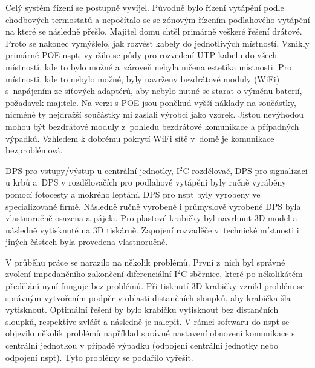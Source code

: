 Celý systém řízení se postupně vyvíjel. Původně bylo řízení vytápění podle chodbových termostatů a nepočítalo se se zónovým řízením podlahového vytápění na které se následně přešlo. Majitel domu chtěl primárně veškeré řešení drátové. Proto se nakonec vymýšlelo, jak rozvést kabely do jednotlivých místností. Vznikly primárně POE \acrshort{nspt}, využilo se půdy pro rozvedení UTP kabelu do všech místností, kde to bylo možné a~zároveň nebyla ničena estetika místnosti. Pro místnosti, kde to nebylo možné, byly navrženy bezdrátové moduly (WiFi) s~napájením ze síťových adaptérů, aby nebylo nutné se starat o výměnu baterií, požadavek majitele. Na verzi s POE jsou poněkud vyšší náklady na součástky, nicméně ty nejdražší součástky mi zaslali výrobci jako vzorek. Jistou nevýhodou mohou být bezdrátové moduly z~pohledu bezdrátové komunikace a případných výpadků. Vzhledem k dobrému pokrytí WiFi sítě v~domě je komunikace bezproblémová.

DPS pro vstupy/výstup u centrální jednotky, I$^{2}$C rozdělovač, DPS pro signalizaci u krbů a~DPS v rozdělovačích pro podlahové vytápění byly ručně vyráběny pomocí fotocesty a mokrého leptání. DPS pro \acrshort{nspt} byly vyrobeny ve specializované firmě. Následně ručně vyrobené i průmyslově vyrobené DPS byla vlastnoručně osazena a pájela. Pro plastové krabičky byl navrhnut 3D model a následně vytisknuté na 3D tiskárně. Zapojení rozvaděče v~technické místnosti i jiných částech byla provedena vlastnoručně.

V průběhu práce se narazilo na několik problémů. První z~nich byl správné zvolení impedančního zakončení diferenciální I$^{2}$C sběrnice, které po několikátém předělání nyní funguje bez problémů. Při tisknutí 3D krabičky vznikl problém se správným vytvořením podpěr v oblasti distančních sloupků, aby krabička šla vytisknout. Optimální řešení by bylo krabičku vytisknout bez distančních sloupků, respektive zvlášť a následně je nalepit. V rámci softwaru do \acrshort{nspt} se objevilo několik problémů například správné nastavení obnovení komunikace s centrální jednotkou v případě výpadku (odpojení centrální jednotky nebo odpojení \acrshort{nspt}). Tyto problémy se podařilo vyřešit.

